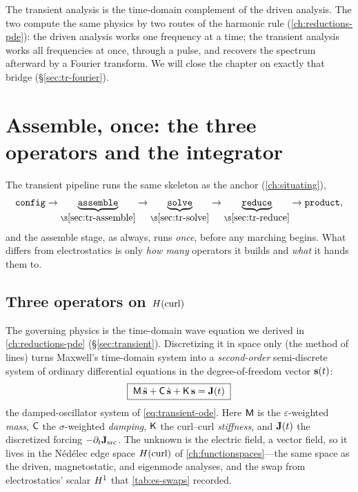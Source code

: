 The transient analysis is the time-domain complement of the driven analysis. The
two compute the same physics by two routes of the harmonic rule
(\cref{ch:reductions-pde}): the driven analysis works one frequency at a time; the
transient analysis works all frequencies at once, through a pulse, and recovers
the spectrum afterward by a Fourier transform. We will close the chapter on
exactly that bridge (\S\ref{sec:tr-fourier}).

\section{Assemble, once: the three operators and the integrator}
\label{sec:tr-assemble}

The transient pipeline runs the same skeleton as the anchor
(\cref{ch:situating}),
\[
  \texttt{config} \to \underbrace{\texttt{assemble}}_{\S\ref{sec:tr-assemble}}
  \to \underbrace{\texttt{solve}}_{\S\ref{sec:tr-solve}}
  \to \underbrace{\texttt{reduce}}_{\S\ref{sec:tr-reduce}} \to \texttt{product},
\]
and the assemble stage, as always, runs \emph{once}, before any marching begins.
What differs from electrostatics is only \emph{how many} operators it builds and
\emph{what} it hands them to.

\subsection{Three operators on \texorpdfstring{$H(\mathrm{curl})$}{H(curl)}}

The governing physics is the time-domain wave equation we derived in
\cref{ch:reductions-pde} (\S\ref{sec:transient}). Discretizing it in space only
(the method of lines) turns Maxwell's time-domain system into a \emph{second-order}
semi-discrete system of ordinary differential equations in the
degree-of-freedom vector $\mathbf{s}(t)$:
\begin{equation}
  \boxed{\;\mathsf{M}\,\ddot{\mathbf{s}} + \mathsf{C}\,\dot{\mathbf{s}} + \mathsf{K}\,\mathbf{s} = \mathbf{J}(t)\;}
  \label{eq:tr-secondorder}
\end{equation}
the damped-oscillator system of \cref{eq:transient-ode}. Here $\mathsf{M}$ is the
$\varepsilon$-weighted \emph{mass}, $\mathsf{C}$ the $\sigma$-weighted \emph{damping},
$\mathsf{K}$ the curl--curl \emph{stiffness}, and $\mathbf{J}(t)$ the discretized forcing
$-\partial_t\mathbf{J}_{\text{src}}$. The unknown is the electric field, a vector field,
so it lives in the Nédélec edge space $H(\mathrm{curl})$ of \cref{ch:functionspaces}---the
same space as the driven, magnetostatic, and eigenmode analyses, and the swap from
electrostatics' scalar $H^1$ that \cref{tab:es-swaps} recorded.

